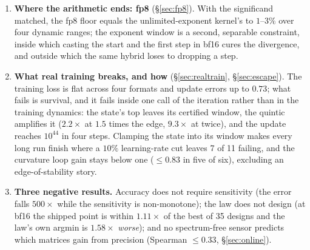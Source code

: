 \begin{enumerate}
wrong dynamic range in one direction only (252 decisions); the graded schedule gains a
median $3.06\times$ where the first-slot premium exceeds two bits and is neutral on real
momentum ($0.9$ bits).
\item \textbf{Where the arithmetic ends: fp8} (\S\ref{sec:fp8}).  With the significand
matched, the fp8 floor equals the unlimited-exponent kernel's to $1$--$3\%$ over four
dynamic ranges; the exponent window is a second, separable constraint, inside which casting
the start and the first step in bf16 cures the divergence, and outside which the same hybrid
loses to dropping a step.
\item \textbf{What real training breaks, and how} (\S\ref{sec:realtrain},
\S\ref{sec:escape}).  The training loss is flat across four formats and update errors up
to $0.73$; what fails is survival, and it fails inside one call of the iteration rather
than in the training dynamics: the state's top leaves its certified window, the quintic
amplifies it ($2.2\times$ at $1.5$ times the edge, $9.3\times$ at twice), and the update
reaches $10^{44}$ in four steps.  Clamping the state into its window makes every long run
finish where a $10\%$ learning-rate cut leaves 7 of 11 failing, and the curvature loop gain
stays below one ($\le0.83$ in five of six), excluding an edge-of-stability story.
\item \textbf{Three negative results.}  Accuracy does not require sensitivity (the error
falls $500\times$ while the sensitivity is non-monotone); the law does not design (at
bf16 the shipped point is within $1.11\times$ of the best of 35 designs and the law's own
argmin is $1.58\times$ \emph{worse}); and no spectrum-free sensor predicts which matrices
gain from precision (Spearman $\le0.33$, \S\ref{sec:online}).
\end{enumerate}
